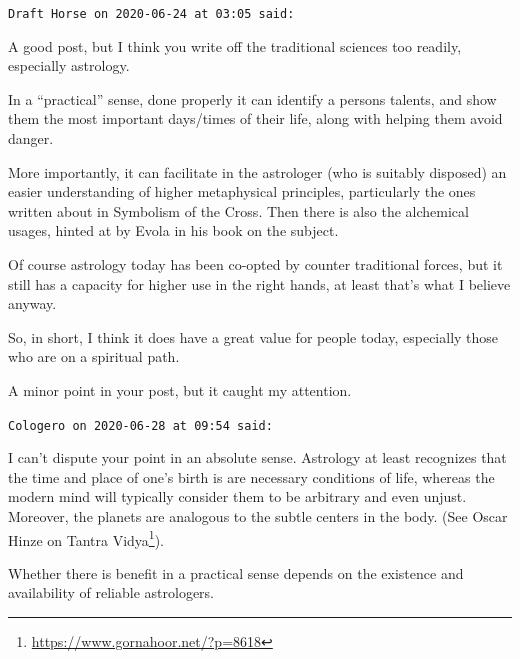 \begin{footnotesize}\begin{sffamily}



\texttt{Draft Horse on 2020-06-24 at 03:05 said: }

A good post, but I think you write off the traditional sciences too readily, especially astrology. 

In a “practical” sense, done properly it can identify a persons talents, and show them the most important days/times of their life, along with helping them avoid danger. 

More importantly, it can facilitate in the astrologer (who is suitably disposed) an easier understanding of higher metaphysical principles, particularly the ones written about in Symbolism of the Cross. Then there is also the alchemical usages, hinted at by Evola in his book on the subject. 

Of course astrology today has been co-opted by counter traditional forces, but it still has a capacity for higher use in the right hands, at least that's what I believe anyway. 

So, in short, I think it does have a great value for people today, especially those who are on a spiritual path.

A minor point in your post, but it caught my attention.


\hfill

\texttt{Cologero on 2020-06-28 at 09:54 said: }

I can't dispute your point in an absolute sense. Astrology at least recognizes that the time and place of one's birth is are necessary conditions of life, whereas the modern mind will typically consider them to be arbitrary and even unjust. Moreover, the planets are analogous to the subtle centers in the body. (See Oscar Hinze on Tantra Vidya\footnote{\url{https://www.gornahoor.net/?p=8618}}).

Whether there is benefit in a practical sense depends on the existence and availability of reliable astrologers.


\end{sffamily}\end{footnotesize}
